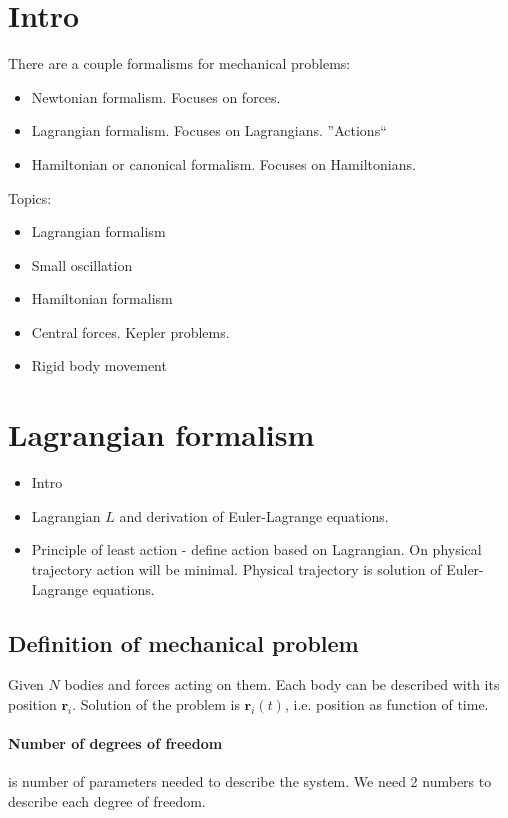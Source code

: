 \section{Intro}
There are a couple formalisms for mechanical problems:
\begin{itemize}
	\item Newtonian formalism. Focuses on forces.
	\item Lagrangian formalism. Focuses on Lagrangians. ''Actions``
	\item Hamiltonian or canonical formalism. Focuses on Hamiltonians.
\end{itemize}

Topics:
\begin{itemize}
	\item Lagrangian formalism
	\item Small oscillation
	\item Hamiltonian formalism
	\item Central forces. Kepler problems.
	\item Rigid body movement
\end{itemize}

\section{Lagrangian formalism}
\begin{itemize}
	\item Intro
	\item Lagrangian $ L $ and derivation of Euler-Lagrange equations. 
	\item Principle of least action - define action based on Lagrangian. On physical trajectory action will be minimal. Physical trajectory is solution of Euler-Lagrange equations. 
\end{itemize}

\subsection{Definition of mechanical problem}
Given $N$ bodies and forces acting on them. Each body can be described with its position $\mathbf{r}_i$. Solution of the problem is $\mathbf{r}_i(t)$, i.e. position as function of time.

\paragraph{Number of degrees of freedom} is number of parameters needed to describe the system. We need 2 numbers to describe each degree of freedom.
